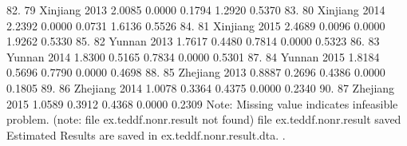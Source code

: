  82. {\VBAR}  79       Xinjiang   2013   2.0085   0.0000   0.1794   1.2920   0.5370 {\VBAR}
 83. {\VBAR}  80       Xinjiang   2014   2.2392   0.0000   0.0731   1.6136   0.5526 {\VBAR}
 84. {\VBAR}  81       Xinjiang   2015   2.4689   0.0096   0.0000   1.9262   0.5330 {\VBAR}
 85. {\VBAR}  82         Yunnan   2013   1.7617   0.4480   0.7814   0.0000   0.5323 {\VBAR}
 86. {\VBAR}  83         Yunnan   2014   1.8300   0.5165   0.7834   0.0000   0.5301 {\VBAR}
 87. {\VBAR}  84         Yunnan   2015   1.8184   0.5696   0.7790   0.0000   0.4698 {\VBAR}
 88. {\VBAR}  85       Zhejiang   2013   0.8887   0.2696   0.4386   0.0000   0.1805 {\VBAR}
 89. {\VBAR}  86       Zhejiang   2014   1.0078   0.3364   0.4375   0.0000   0.2340 {\VBAR}
 90. {\VBAR}  87       Zhejiang   2015   1.0589   0.3912   0.4368   0.0000   0.2309 {\VBAR}
     {\BLC}
Note: Missing value indicates infeasible problem.
(note: file ex.teddf.nonr.result not found)
file ex.teddf.nonr.result saved
{\smallskip}
Estimated Results are saved in ex.teddf.nonr.result.dta.
{\smallskip}
. 
